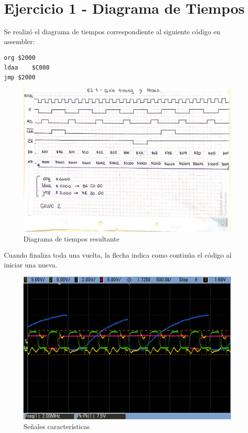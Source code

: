 \documentclass{article}
\begin{document}
\newgeometry{} %



\tableofcontents
\newpage

\section*{Ejercicio 1 - Diagrama de Tiempos}

Se realizó el diagrama de tiempos correspondiente al siguiente código en assembler:

\begin{lstlisting}
org	$2000
ldaa	$C000
jmp	$2000
\end{lstlisting}

\begin{figure}[ht]
	\centering
	\includegraphics[width=0.8 \textwidth]
	{../Ej1/diagramaTiempos.jpeg}
	\caption{Diagrama de tiempos resultante}
	\label{fig:ej12}
\end{figure}

Cuando finaliza toda una vuelta, la flecha indica como continúa el código al iniciar una nueva.

\begin{figure}[ht]
	\centering
	\includegraphics[width=0.7 \textwidth]
	{../Ej1/guia1_12.png}
	\caption{Señales características}
	\label{fig:ej12}
\end{figure}
\end{document}

